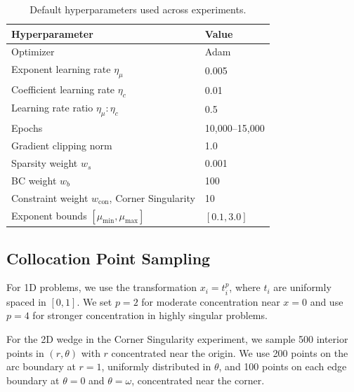 \documentclass{article}
\theoremstyle{plain}
\theoremstyle{definition}
\theoremstyle{remark}
\begin{document}
\begin{table}[t!]
	\centering
	\caption{Default hyperparameters used across experiments.}
	\label{tab:hyperparams}
	\begin{tabular}{ll}
		\arrayrulecolor{tablerule}\toprule
		\rowcolor{tableheader}
		Hyperparameter                                         & Value          \\
		\midrule
		Optimizer                                              & Adam           \\
		\rowcolor{tablerowalt}
		Exponent learning rate $\eta_\mu$                      & 0.005          \\
		Coefficient learning rate $\eta_c$                     & 0.01           \\
		\rowcolor{tablerowalt}
		Learning rate ratio $\eta_\mu:\eta_c$                  & 0.5            \\
		Epochs                                                 & 10,000--15,000 \\
		\rowcolor{tablerowalt}
		Gradient clipping norm                                 & 1.0            \\
		Sparsity weight $w_s$                                  & 0.001          \\
		\rowcolor{tablerowalt}
		BC weight $w_b$                                        & 100            \\
		Constraint weight $w_{\text{con}}$, Corner Singularity & 10             \\
		\rowcolor{tablerowalt}
		Exponent bounds $[\mu_{\min}, \mu_{\max}]$             & $[0.1, 3.0]$   \\
		\bottomrule
	\end{tabular}
\end{table}

\subsection{Collocation Point Sampling}

For 1D problems, we use the transformation $x_i = t_i^p$, where $t_i$ are uniformly spaced in $[0,1]$. We set $p=2$ for moderate concentration near $x=0$ and use $p=4$ for stronger concentration in highly singular problems.

For the 2D wedge in the Corner Singularity experiment, we sample 500 interior points in $(r,\theta)$ with $r$ concentrated near the origin. We use 200 points on the arc boundary at $r=1$, uniformly distributed in $\theta$, and 100 points on each edge boundary at $\theta=0$ and $\theta=\omega$, concentrated near the corner.
\end{document}
